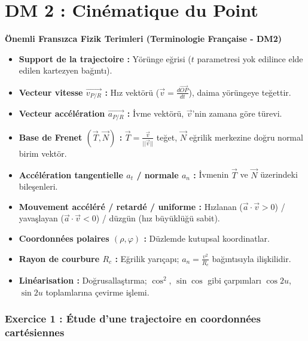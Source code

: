 \documentclass[11pt,a4paper]{article}
\begin{document}
\newpage

\part*{DM 2 : Cinématique du Point}

\begin{terimbox}{\textbf{Önemli Fransızca Fizik Terimleri (Terminologie Française - DM2)}}
\begin{itemize}
    \item \textbf{Support de la trajectoire :} Yörünge eğrisi ($t$ parametresi yok edilince elde edilen kartezyen bağıntı).
    \item \textbf{Vecteur vitesse $\vec{v_{P/R}}$ :} Hız vektörü ($\vec{v}=\frac{d\vec{OP}}{dt}$), daima yörüngeye teğettir.
    \item \textbf{Vecteur accélération $\vec{a_{P/R}}$ :} İvme vektörü, $\vec{v}$'nin zamana göre türevi.
    \item \textbf{Base de Frenet $(\vec{T}, \vec{N})$ :} $\vec{T}=\frac{\vec{v}}{||\vec{v}||}$ teğet, $\vec{N}$ eğrilik merkezine doğru normal birim vektör.
    \item \textbf{Accélération tangentielle $a_t$ / normale $a_n$ :} İvmenin $\vec{T}$ ve $\vec{N}$ üzerindeki bileşenleri.
    \item \textbf{Mouvement accéléré / retardé / uniforme :} Hızlanan ($\vec{a}\cdot\vec{v}>0$) / yavaşlayan ($\vec{a}\cdot\vec{v}<0$) / düzgün (hız büyüklüğü sabit).
    \item \textbf{Coordonnées polaires $(\rho,\varphi)$ :} Düzlemde kutupsal koordinatlar.
    \item \textbf{Rayon de courbure $R_c$ :} Eğrilik yarıçapı; $a_n=\frac{v^2}{R_c}$ bağıntısıyla ilişkilidir.
    \item \textbf{Linéarisation :} Doğrusallaştırma; $\cos^2$, $\sin\cos$ gibi çarpımları $\cos 2u$, $\sin 2u$ toplamlarına çevirme işlemi.
\end{itemize}
\end{terimbox}

\vspace{0.5cm}

\section*{Exercice 1 : Étude d'une trajectoire en coordonnées cartésiennes}
\end{document}
